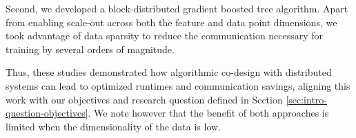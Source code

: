 Second, we developed a block-distributed gradient boosted tree
algorithm. Apart from enabling scale-out across both the feature
and data point dimensions, we took advantage of data sparsity
to reduce the communication necessary for training by several
orders of magnitude.

Thus, these studies demonstrated how
algorithmic co-design with distributed systems can lead
to optimized runtimes and communication savings, aligning
this work with our objectives and research question
defined in Section \ref{sec:intro-question-objectives}.
We note however that the benefit of both approaches
is limited when the dimensionality of the data is low.